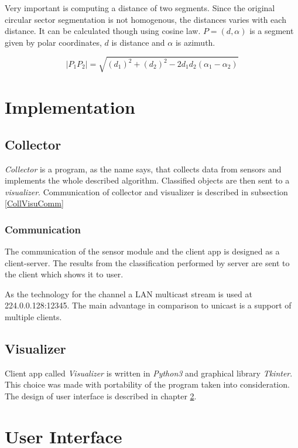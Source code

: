 Very important is computing a distance of two segments. Since the original circular sector segmentation
is not homogenous, the distances varies with each distance. It can be calculated though using
cosine law. $P = (d, \alpha)$ is a segment given by polar coordinates, $d$ is distance and $\alpha$ is
azimuth.

$$|P_{1} P_{2}| = \sqrt{(d_{1})^{2} + (d_{2})^{2} - 2d_{1}d_{2}(\alpha_1 - \alpha_2)}$$




\chapter{Implementation}

\section{Collector}
{\it Collector} is a program, as the name says, that collects data from sensors and implements
the whole described algorithm. Classified objects are then sent to a {\it visualizer}.
Communication of collector and visualizer is described in subsection \ref{CollVisuComm}

\subsection*{Communication}
\label{CollVisuComm}
The communication of the sensor module and the client app is designed as a client-server. The results
from the classification performed by server are sent to the client which shows it to user.

As the technology for the channel a LAN multicast stream is used at 224.0.0.128:12345.
The main advantage in comparison to unicast is a support of multiple clients.

\section{Visualizer}
Client app called {\it Visualizer} is written in {\it Python3} and graphical library {\it Tkinter}.
This choice was made with portability of the program taken into consideration.
The design of user interface is described in chapter \ref{Label:UI}.






\chapter{User Interface}
\label{Label:UI}

